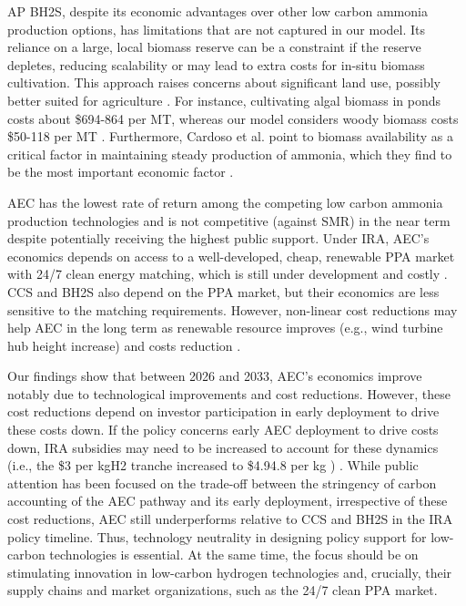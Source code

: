 \documentclass{article}
\begin{document}
AP BH2S, despite its economic advantages over other low carbon ammonia production options, has limitations that are not captured in our model. Its reliance on a large, local biomass reserve can be a constraint if the reserve depletes, reducing scalability or may lead to extra costs for in-situ biomass cultivation. This approach raises concerns about significant land use, possibly better suited for agriculture \cite{Arodudu2020, Young1991}. For instance, cultivating algal biomass in ponds costs about \$694-864 per MT, whereas our model considers woody biomass costs \$50-118 per MT \cite{Klein2021}. Furthermore, Cardoso et al. point to biomass availability as a critical factor in maintaining steady production of ammonia, which they find to be the most important economic factor \cite{Cardoso2021}.

AEC has the lowest rate of return among the competing low carbon ammonia production technologies and is not competitive (against SMR) in the near term despite potentially receiving the highest public support. Under IRA, AEC’s economics depends on access to a well-developed, cheap, renewable PPA market with 24/7 clean energy matching, which is still under development and costly \cite{Miller2020, Hausman2023, Jain2022}. CCS and BH2S also depend on the PPA market, but their economics are less sensitive to the matching requirements. However, non-linear cost reductions may help AEC in the long term as renewable resource improves (e.g., wind turbine hub height increase) and costs reduction \cite{OEDI2022, Pfenninger2016}.

Our findings show that between 2026 and 2033, AEC’s economics improve notably due to technological improvements and cost reductions. However, these cost reductions depend on investor participation in early deployment to drive these costs down. If the policy concerns early AEC deployment to drive costs down, IRA subsidies may need to be increased to account for these dynamics (i.e., the \$3 per kgH2 tranche increased to \$4.94.8 per kg ) . While public attention has been focused on the trade-off between the stringency of carbon accounting of the AEC pathway and its early deployment, irrespective of these cost reductions, AEC still underperforms relative to CCS and BH2S in the IRA policy timeline. Thus, technology neutrality in designing policy support for low-carbon technologies is essential. At the same time, the focus should be on stimulating innovation in low-carbon hydrogen technologies and, crucially, their supply chains and market organizations, such as the 24/7 clean PPA market.
\end{document}
